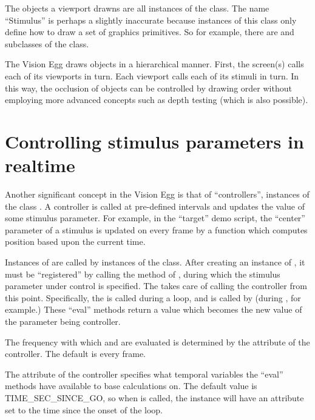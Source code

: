 \documentclass{manual}
\begin{document}
The objects a viewport drawns are all instances of the
 class. The name ``Stimulus'' is perhaps a slightly
inaccurate because instances of this class only define how to draw a
set of graphics primitives. So for example, there are
 and  subclasses of the
 class.

The Vision Egg draws objects in a hierarchical manner.  First, the
screen(s) calls each of its viewports in turn.  Each viewport calls
each of its stimuli in turn.  In this way, the occlusion of objects
can be controlled by drawing order without employing more advanced
concepts such as depth testing (which is also possible).

\chapter{Controlling stimulus parameters in realtime \label{controllers}}

Another significant concept in the Vision Egg is that of
``controllers'', instances of the class .  A
controller is called at pre-defined intervals and updates the value of
some stimulus parameter.  For example, in the ``target'' demo script,
the ``center'' parameter of a  stimulus is updated on
every frame by a function which computes position based upon the
current time.

Instances of  are called by instances of the
 class.  After creating an instance of
, it must be ``registered'' by calling the
 method of , during which
the stimulus parameter under control is specified.  The
 takes care of calling the controller from this
point. Specifically, the  is called during a
 loop, and  is called by
 (during , for
example.)  These ``eval'' methods return a value which becomes the
new value of the parameter being controller.

The frequency with which  and
 are evaluated is determined by the
 attribute of the controller.  The default
 is every frame.

The  attribute of the controller specifies
what temporal variables the ``eval'' methods have available to base
calculations on.  The default value is TIME_SEC_SINCE_GO, so when
 is called, the instance will have an
attribute  set to the time since the onset of
the  loop.
\end{document}

